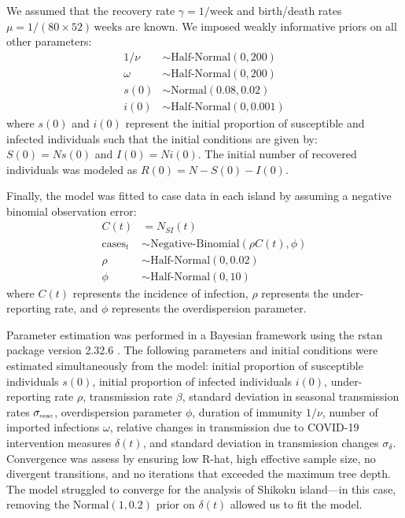\documentclass[12pt]{article}
\newcommand{\tsub}[2]{#1_{{\textrm{\tiny #2}}}}
\begin{document}
We assumed that the recovery rate $\gamma = 1/\mathrm{week}$ and birth/death rates $\mu = 1/(80\times 52)\,\mathrm{weeks}$ are known.
We imposed weakly informative priors on all other parameters:
\begin{align}
1/\nu &\sim \textrm{Half-Normal}(0, 200)\\
\omega &\sim \textrm{Half-Normal}(0, 200)\\
s(0) &\sim \textrm{Normal}(0.08, 0.02)\\
i(0) &\sim \textrm{Half-Normal}(0, 0.001)
\end{align}
where $s(0)$ and $i(0)$ represent the initial proportion of susceptible and infected individuals such that the initial conditions are given by: $S(0) = Ns(0)$ and $I(0) = N i(0)$.
The initial number of recovered individuals was modeled as $R(0) = N - S(0) - I(0)$.

Finally, the model was fitted to case data in each island by assuming a negative binomial observation error:
\begin{align}
C(t) &= N_{SI}(t)\\
\textrm{cases}_t &\sim \textrm{Negative-Binomial}(\rho C(t), \phi)\\
\rho &\sim \textrm{Half-Normal}(0, 0.02)\\
\phi &\sim \textrm{Half-Normal}(0, 10)
\end{align}
where $C(t)$ represents the incidence of infection, $\rho$ represents the under-reporting rate, and $\phi$ represents the overdispersion parameter.

Parameter estimation was performed in a Bayesian framework using the rstan package version 2.32.6 \citep{carpenter2017stan}.
The following parameters and initial conditions were estimated simultaneously from the model: initial proportion of susceptible individuals $s(0)$, initial proportion of infected individuals $i(0)$, under-reporting rate $\rho$, transmission rate $\beta$, standard deviation in seasonal transmission rates $\tsub{\sigma}{seas}$, overdispersion parameter $\phi$, duration of immunity $1/\nu$, number of imported infections $\omega$, relative changes in transmission due to COVID-19 intervention measures $\delta(t)$, and standard deviation in transmission changes $\sigma_\delta$.
Convergence was assess by ensuring low R-hat, high effective sample size, no divergent transitions, and no iterations that exceeded the maximum tree depth.
The model struggled to converge for the analysis of Shikoku island---in this case, removing the $\mathrm{Normal}(1, 0.2)$ prior on $\delta(t)$ allowed us to fit the model.
\end{document}
